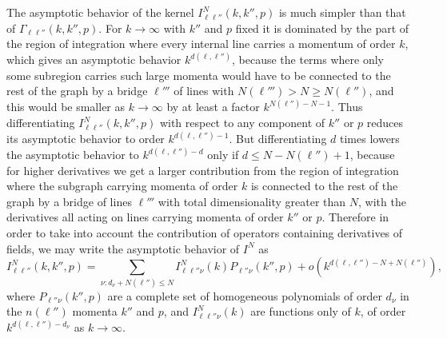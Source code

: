 The asymptotic behavior of the kernel $I_{\ell\ell''}^N(k,k'',p)$ is much simpler than that of $\Gamma_{\ell\ell''}(k,k'',p)$. For $k\to\infty$ with $k''$ and $p$ fixed it is dominated by the part of the region of integration where every internal line carries a momentum of order $k$, which gives an asymptotic behavior $k^{d(\ell,\ell'')}$, because the terms where only some subregion carries such large momenta would have to be connected to the rest of the graph by a bridge $\ell'''$ of lines with $N(\ell''')>N\geq N(\ell'')$, and this would be smaller as $k\to\infty$ by at least a factor $k^{N(\ell'')-N-1}$. Thus differentiating $I_{\ell\ell''}^N(k,k'',p)$ with respect to any component of $k''$ or $p$ reduces its asymptotic behavior to order $k^{d(\ell,\ell'')-1}$. But differentiating $d$ times lowers the asymptotic behavior to $k^{d(\ell,\ell'')-d}$ only if $d\leq N-N(\ell'')+1$, because for higher derivatives we get a larger contribution from the region of integration where the subgraph carrying momenta of order $k$ is connected to the rest of the graph by a bridge of lines $\ell'''$ with total dimensionality greater than $N$, with the derivatives all acting on lines carrying momenta of order $k''$ or $p$. Therefore in order to take into account the contribution of operators containing derivatives of fields, we may write the asymptotic behavior of $I^N$ as
\begin{equation}
I_{\ell\ell''}^N(k,k'',p)
=
\sum_{\nu:d_\nu+N(\ell'')\leq N}
I_{\ell\ell''\nu}^N(k)
P_{\ell''\nu}(k'',p)
+o\left(k^{d(\ell,\ell'')-N+N(\ell'')}\right),
\tag{20.A.6}\label{eq:20.A.6}
\end{equation}
where $P_{\ell''\nu}(k'',p)$ are a complete set of homogeneous polynomials of order $d_\nu$ in the $n(\ell'')$ momenta $k''$ and $p$, and $I_{\ell\ell''\nu}^N(k)$ are functions only of $k$, of order $k^{d(\ell,\ell'')-d_\nu}$ as $k\to\infty$.

